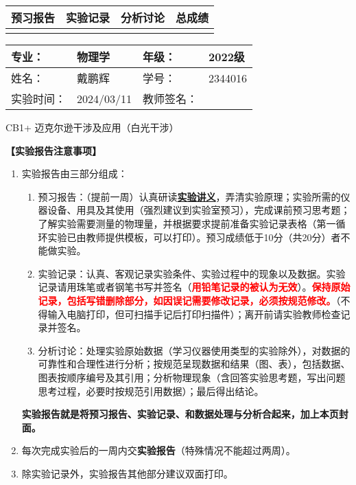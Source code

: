 \documentclass[dvipsnames, svgnames,a4paper,11pt]{article}
\begin{document}
\begin{table}
	\renewcommand\arraystretch{1.7}
	\begin{tabularx}{\textwidth}{
		|X|X|X|X
		|X|X|X|X|}
	\hline
	\multicolumn{2}{|c|}{预习报告}&\multicolumn{2}{|c|}{实验记录}&\multicolumn{2}{|c|}{分析讨论}&\multicolumn{2}{|c|}{总成绩}\\
	\hline
	& & & & & & & \\
	\hline
	\end{tabularx}
\end{table}


\begin{table}
	\renewcommand\arraystretch{1.7}
	\begin{tabularx}{\textwidth}{|X|X|X|X|}
	\hline
	专业：& 物理学 &年级：& 2022级\\
	\hline
	姓名：& 戴鹏辉  & 学号： & 2344016 \\
	\hline
	实验时间：& 2024/03/11 & 教师签名：& \\
	\hline
	\end{tabularx}
\end{table}

\begin{center}
	\LARGE CB1+ \quad 迈克尔逊干涉及应用（白光干涉） 
\end{center}

\textbf{【实验报告注意事项】}
\begin{enumerate}
	\item 实验报告由三部分组成：
	\begin{enumerate}
		\item 预习报告：（提前一周）认真研读\underline{\textbf{实验讲义}}，弄清实验原理；实验所需的仪器设备、用具及其使用（强烈建议到实验室预习），完成课前预习思考题；了解实验需要测量的物理量，并根据要求提前准备实验记录表格（第一循环实验已由教师提供模板，可以打印）。预习成绩低于10分（共20分）者不能做实验。
	    \item 实验记录：认真、客观记录实验条件、实验过程中的现象以及数据。实验记录请用珠笔或者钢笔书写并签名（\textcolor{red}{\textbf{用铅笔记录的被认为无效}}）。\textcolor{red}{\textbf{保持原始记录，包括写错删除部分，如因误记需要修改记录，必须按规范修改。}}（不得输入电脑打印，但可扫描手记后打印扫描件）；离开前请实验教师检查记录并签名。
	    \item 分析讨论：处理实验原始数据（学习仪器使用类型的实验除外），对数据的可靠性和合理性进行分析；按规范呈现数据和结果（图、表），包括数据、图表按顺序编号及其引用；分析物理现象（含回答实验思考题，写出问题思考过程，必要时按规范引用数据）；最后得出结论。
	\end{enumerate}
	\textbf{实验报告就是将预习报告、实验记录、和数据处理与分析合起来，加上本页封面。}
	\item 每次完成实验后的一周内交\textbf{实验报告}（特殊情况不能超过两周）。
	\item 除实验记录外，实验报告其他部分建议双面打印。
\end{enumerate}
\end{document}
